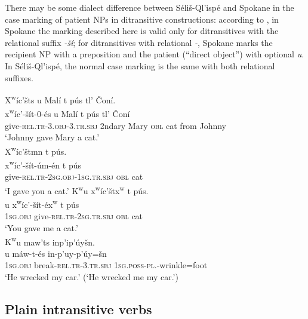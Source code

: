 \documentclass[output=paper,colorlinks,citecolor=brown]{langscibook}
\begin{document}
  There may be some dialect difference between S\'eli\v{s}-Ql'isp\'e
  and Spokane in the case marking of patient NPs in ditransitive
  constructions: according to \citet[24]{Carlson:1980}, in Spokane the
  marking described here is valid only for ditransitives with the
  relational suffix \emph{-\v{s}\'i}; for ditransitives with
  relational \emph{-{\textltilde}}, Spokane marks the recipient NP
  with a preposition and the patient (``direct object'') with
  optional \emph{{\textltilde}u}.  In S\'eli\v{s}-Ql'isp\'e, the
  normal case marking is the same with both relational suffixes.\largerpage[-1]


\ea 
\label{ex-thomason-7}
X\textsuperscript w\'ic'\v{s}ts {\textltilde}u Mal\'i t p\'us tl' \v{C}on\'i. \\
\gll x\textsuperscript w\'ic'-\v{s}\'it-0-\'es {\textltilde}u Mal\'i t p\'us tl' \v{C}on\'i\\
     give-\textsc{rel.tr}-3.\textsc{obj}-3.\textsc{tr.sbj} 2ndary Mary \textsc{  obl} cat from Johnny\\
\glt `Johnny gave Mary a cat.' \\
\pagebreak
\ex X\textsuperscript w\'ic'\v{s}tmn t p\'us.  \\
\label{ex-thomason-8}
\gll x\textsuperscript w\'ic'-\v{s}\'it-\'um-\'en t p\'us\\
give-\textsc{rel.tr}-\textsc{2sg}.\textsc{obj}-\textsc{1sg}.\textsc{tr.sbj} \textsc{obl} cat\\
\glt `I gave you a cat.'
\ex 
\label{ex-thomason-9}
{K\textsuperscript w}u x\textsuperscript w\'ic'\v{s}tx\textsuperscript w t  p\'us. \\
 u x\textsuperscript
w\'ic'-\v{s}\'it-\'ex\textsuperscript w t p\'us\\
\textsc{1sg}.\textsc{obj} give-\textsc{rel.tr}-\textsc{2sg}.\textsc{tr.sbj} \textsc{obl} cat \\
 \glt  `You gave me a cat.'\\
 \ex 
\label{ex-thomason-10}
{K\textsuperscript w}u maw'{\textltilde}ts inp'ip'\'uy\v{s}n. \\
u m\'aw-{\textltilde}t-\'es in-p'uy-p'\'uy=\v{s}n\\
     \textsc{1sg}.\textsc{obj} break-\textsc{rel.tr}-3.\textsc{tr.sbj} \textsc{1sg}.\textsc{poss}-\textsc{pl}.-wrinkle=foot \\
\glt `He wrecked my car.' (`He wrecked me my car.')
\z

\subsection{Plain intransitive verbs}  %
\label{thomason_section_2.3}
\end{document}
